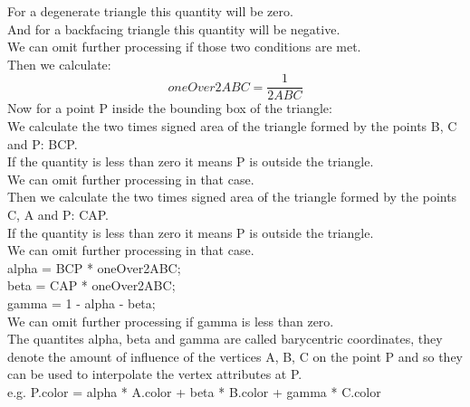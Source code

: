 For a degenerate triangle this quantity will be zero.\\
And for a backfacing triangle this quantity will be negative.\\
We can omit further processing if those two conditions are met.\\
Then we calculate:
\[
oneOver2ABC = \frac{1}{2ABC}
\]
Now for a point P inside the bounding box of the triangle: \\
We calculate the two times signed area of the triangle formed by the points B, C and P: BCP.\\
If the quantity is less than zero it means P is outside the triangle.\\
We can omit further processing in that case.\\

Then we calculate the two times signed area of the triangle formed by the points C, A and P: CAP.\\
If the quantity is less than zero it means P is outside the triangle.\\
We can omit further processing in that case.\\

alpha = BCP * oneOver2ABC;\\
beta = CAP * oneOver2ABC;\\
gamma = 1 - alpha - beta;\\

We can omit further processing if gamma is less than zero.\\
The quantites alpha, beta and gamma are called barycentric coordinates, they denote the amount of influence of the vertices A, B, C on the point P and so they can be used to interpolate the vertex attributes at P.\\

e.g. P.color = alpha * A.color + beta * B.color + gamma * C.color \\

